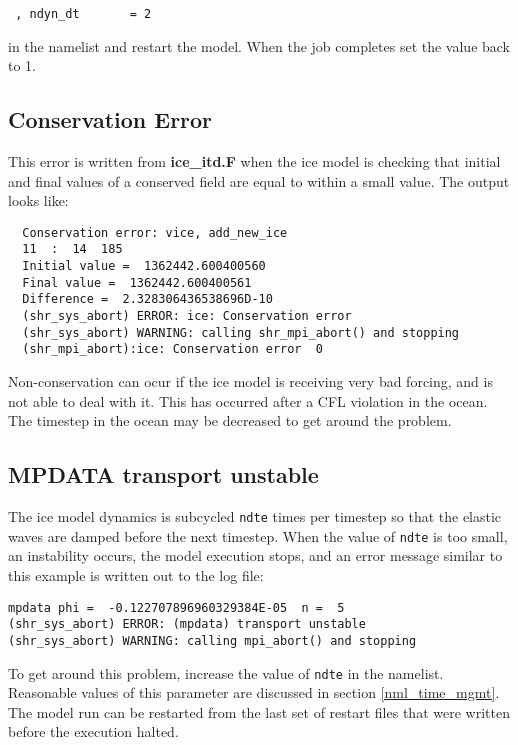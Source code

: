 \begin{verbatim}
 , ndyn_dt       = 2
\end{verbatim}

in the namelist and restart the model.  When the job completes set the value
back to 1.

\subsection{Conservation Error}

This error is written from {\bf ice\_itd.F} when the ice model is checking
that initial and final values of a conserved field are equal to within
a small value. The output looks like:

\begin{verbatim}
  Conservation error: vice, add_new_ice
  11  :  14  185
  Initial value =  1362442.600400560
  Final value =  1362442.600400561
  Difference =  2.328306436538696D-10
  (shr_sys_abort) ERROR: ice: Conservation error
  (shr_sys_abort) WARNING: calling shr_mpi_abort() and stopping
  (shr_mpi_abort):ice: Conservation error  0
\end{verbatim}

Non-conservation can ocur if the ice model is receiving
very bad forcing, and is not able to deal with it.  This has occurred
after a CFL violation in the ocean.  The timestep in the ocean may
be decreased to get around the problem.

\subsection{MPDATA transport unstable}

The ice model dynamics is subcycled {\tt ndte} times per timestep
so that the elastic waves are damped before the next timestep. 
When the value of {\tt ndte} is too small, an instability occurs,
the model execution stops, and an error message similar to this
example is written out to the log file:

\begin{verbatim}
mpdata phi =  -0.122707896960329384E-05  n =  5
(shr_sys_abort) ERROR: (mpdata) transport unstable
(shr_sys_abort) WARNING: calling mpi_abort() and stopping
\end{verbatim}

To get around this problem, increase the value of {\tt ndte} in 
the namelist.  Reasonable values of this parameter
are discussed in section \ref{nml_time_mgmt}.  The model
run can be restarted from the last set of restart files
that were written before the execution halted.

